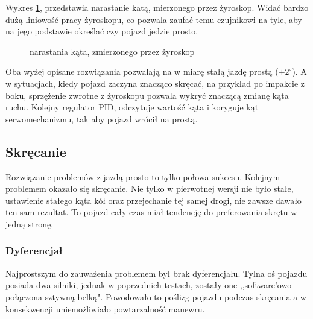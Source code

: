         Wykres \ref{plot:delta_angle_with_gyro}, przedstawia narastanie katą, mierzonego przez żyroskop.
        Widać bardzo dużą liniowość pracy żyroskopu, co pozwala zaufać temu czujnikowi na tyle, aby na jego podstawie określać czy pojazd jedzie prosto.

        \begin{figure}[!ht]
            \centering
                \renewcommand{\figurename}{Wykres}
                \caption{narastania kąta, zmierzonego przez żyroskop}
                \label{plot:delta_angle_with_gyro}
        \end{figure}


    \newpage
    Oba wyżej opisane rozwiązania pozwalają na w miarę stałą jazdę prostą ($\pm 2^\circ$).
    A w sytuacjach, kiedy pojazd zaczyna znacząco skręcać, na przykład po impakcie z boku, sprzężenie zwrotne z żyroskopu pozwala wykryć znaczącą zmianę kąta ruchu.
    Kolejny regulator PID, odczytuje wartość kąta i koryguje kąt serwomechanizmu, tak aby pojazd wrócił na prostą.

    \subsection{Skręcanie}
        Rozwiązanie problemów z jazdą prosto to tylko połowa sukcesu.
        Kolejnym problemem okazało się skręcanie.
        Nie tylko w pierwotnej wersji nie było stałe, ustawienie stałego kąta kół oraz przejechanie tej samej drogi, nie zawsze dawało ten sam rezultat.
        To pojazd cały czas miał tendencję do preferowania skrętu w jedną stronę.

        \subsubsection{Dyferencjał}
        \label{subsubsec:dyferencjal}
        Najprostszym do zauważenia problemem był brak dyferencjału.
        Tylna oś pojazdu posiada dwa silniki, jednak w poprzednich testach, zostały one ,,software'owo połączona sztywną belką".
        Powodowało to poślizg pojazdu podczas skręcania a w konsekwencji uniemożliwiało powtarzalność manewru.

